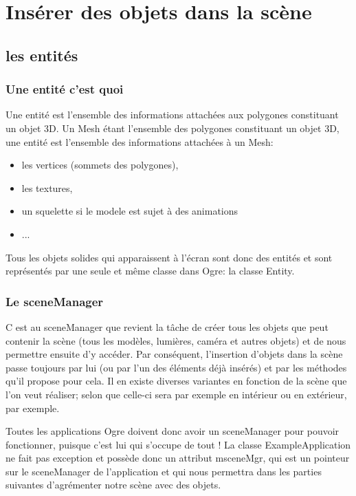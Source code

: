 \chapter{Ins\'erer des objets dans la sc\`ene }

\section{les entit\'es}

\subsection{Une entit\'e c'est quoi}
Une entit\'e est l'ensemble des informations attach\'ees aux polygones constituant un objet 3D.\newline
Un Mesh \'etant l'ensemble des polygones constituant un objet 3D, une entit\'e est l'ensemble des informations attach\'ees \`{a} un Mesh:

\begin{itemize}
\item les vertices (sommets des polygones),
\item les textures,
\item un squelette si le modele est sujet \`{a} des animations
\item...\newline
\end{itemize}


Tous les objets solides qui apparaissent \`{a} l'\'ecran sont donc des entit\'es et sont repr\'esent\'es par une seule et m\^eme classe dans Ogre: la classe Entity.

\subsection{Le sceneManager}
C est au sceneManager que revient la t\^{a}che de cr\'eer tous les objets que peut contenir la sc\`ene (tous les mod\`eles, lumi\`eres, cam\'era et autres objets) et de nous permettre ensuite d'y acc\'eder.\newline
Par cons\'equent, l'insertion d'objets dans la sc\`ene passe toujours par lui (ou par l'un des \'el\'ements d\'ej\`{a} ins\'er\'es) et par les m\'ethodes qu'il propose pour cela.
Il en existe diverses variantes en fonction de la sc\`ene que l'on veut r\'ealiser; selon que celle-ci sera par exemple en int\'erieur ou en ext\'erieur, par exemple.

Toutes les applications Ogre doivent donc avoir un sceneManager pour pouvoir fonctionner, puisque c'est lui qui s'occupe de tout ! La classe ExampleApplication ne fait pas exception et poss\`ede donc un attribut msceneMgr, qui est un pointeur sur le sceneManager de l'application et qui nous permettra dans les parties suivantes d'agr\'ementer notre sc\`ene avec des objets.


